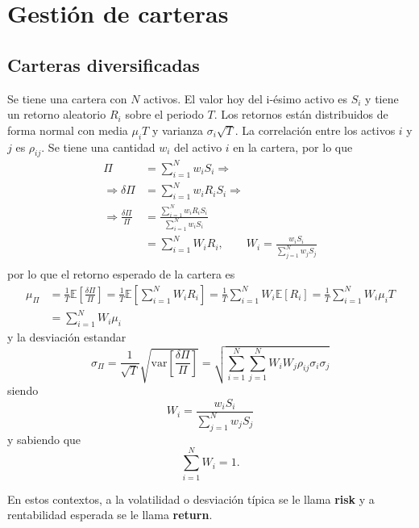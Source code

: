 \section{Gestión de carteras}



\subsection{Carteras diversificadas}
Se tiene una cartera con $N$ activos. El valor hoy del i-ésimo activo es $S_i$ y tiene un retorno aleatorio $R_i$ sobre el periodo $T$. Los retornos están distribuidos de forma normal con media $\mu_i T$ y varianza $\sigma_i\sqrt{T}$. La correlación entre los activos $i$ y $j$ es $\rho_{ij}$. Se tiene una cantidad $w_i$ del activo $i$ en la cartera, por lo que
\begin{align*}
    \Pi &= \sum_{i=1}^N w_i S_i \Rightarrow \\
    \Rightarrow \delta\Pi &= \sum_{i=1}^N w_i R_i S_i \Rightarrow \\
    \Rightarrow \frac{\delta\Pi}{\Pi} &= \frac{\sum_{i=1}^N w_i R_i S_i}{\sum_{i=1}^N w_i S_i} \\
    &= \sum_{i=1}^N W_i R_i, \qquad W_i = \frac{w_i S_i}{\sum_{j=1}^N w_j S_j} \\
\end{align*}
por lo que el retorno esperado de la cartera es
\begin{align}\label{eq:esperanza_cartera}
    \mu_{\Pi} &= \frac{1}{T}\mathbb{E}\left[\frac{\delta\Pi}{\Pi}\right] = \frac{1}{T}\mathbb{E}\left[\sum_{i=1}^N W_i R_i\right] = \frac{1}{T} \sum_{i=1}^N W_i \mathbb{E}[R_i] = \frac{1}{T} \sum_{i=1}^N W_i \mu_i T \nonumber \\
    &= \boxed{\sum_{i=1}^N W_i \mu_i}
\end{align}
y la desviación estandar
\begin{equation}\label{eq:desviacion_cartera}
    \sigma_{\Pi} = \frac{1}{\sqrt{T}}\sqrt{\text{var}\left[ \frac{\delta\Pi}{\Pi} \right]} = \boxed{\sqrt{\sum_{i=1}^N \sum_{j=1}^N W_i W_j \rho_{ij} \sigma_i \sigma_j}}
\end{equation}
siendo
\[
    \boxed{W_i = \frac{w_i S_i}{\sum_{j=1}^N w_j S_j}}
\]
y sabiendo que
\[
    \sum_{i=1}^N W_i = 1.
\]

En estos contextos, a la volatilidad o desviación típica se le llama \textbf{risk} y a rentabilidad esperada se le llama \textbf{return}.





